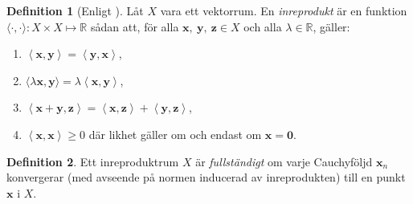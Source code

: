 \documentclass[a4paper, 12pt]{report}
\theoremstyle{definition}
\newtheorem{defi}{Definition}[section]
\theoremstyle{remark}
\newcommand{\llangle}{\left\langle}
\newcommand{\rrangle}{\right\rangle}
\newcommand{\inprod}[2]{\llangle \mathbf{#1}, \mathbf{#2}\rrangle}
\begin{document}
\begin{defi}[Enligt \cite{Young}]\label{def:inreprodukt}
	Låt $X$ vara ett vektorrum. En \emph{inreprodukt} är en funktion $\langle \cdot , \cdot \rangle: X\times X \longmapsto \mathbb{R}$ sådan att, för alla $\mathbf{x},~\mathbf{y},~\mathbf{z}\in X$ och alla $\lambda \in \mathbb{R}$, gäller:
	\begin{enumerate}[label=\textbf{IP\arabic*}]
		\item \label{IP1} $\inprod{x}{y} = \inprod{y}{x}$,
		\item \label{IP2} $\langle \lambda \mathbf{x}, \mathbf{y}\rangle = \lambda \inprod{x}{y}$,
		\item \label{IP3} $\inprod{x+y}{z} =\inprod{x}{z} + \inprod{y}{z}$,
		\item \label{IP4} $\inprod{x}{x} \geq 0$ där likhet gäller om och endast om $\mathbf{x} = \mathbf{0}$. 
	\end{enumerate}
\end{defi}

\begin{defi}\label{def:Cfull}
	Ett inreproduktrum $X$ är \emph{fullständigt} om varje Cauchyföljd $\mathbf{x}_n$ konvergerar (med avseende på normen inducerad av inreprodukten) till en punkt $\mathbf{x}$ i $X$.
\end{defi}
\end{document}
